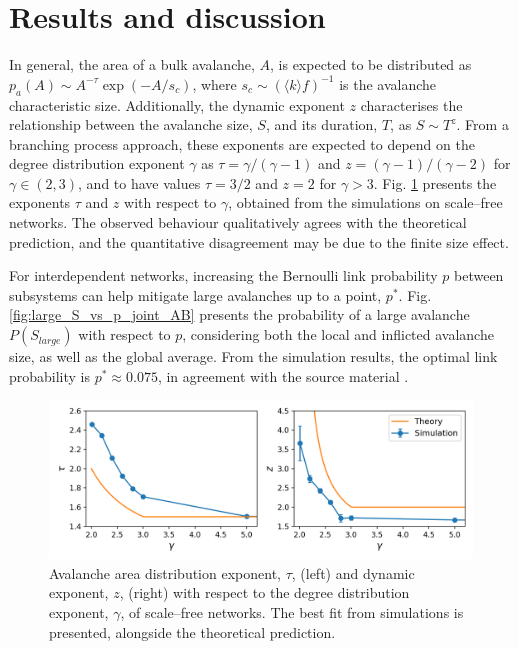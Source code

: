 \section{Results and discussion}

In general, the area of a bulk avalanche, $A$, is expected to be distributed as $p_a(A)\sim A^{-\tau}\exp(-A/s_c)$, where $s_c\sim (\langle k\rangle f)^{-1}$ is the avalanche characteristic size. Additionally, the dynamic exponent $z$ characterises the relationship between the avalanche size, $S$, and its duration, $T$, as $S\sim T^z$. From a branching process approach, these exponents are expected to depend on the degree distribution exponent $\gamma$ as $\tau=\gamma/(\gamma-1)$ and $z=(\gamma-1)/(\gamma-2)$ for $\gamma\in(2,3)$, and to have values $\tau=3/2$ and $z=2$ for $\gamma>3$. Fig. \ref{fig:tau_and_z_vs_gamma} presents the exponents $\tau$ and $z$ with respect to $\gamma$, obtained from the simulations on scale--free networks. The observed behaviour qualitatively agrees with the theoretical prediction, and the quantitative disagreement may be due to the finite size effect. 

For interdependent networks, increasing the Bernoulli link probability $p$ between subsystems can help mitigate large avalanches up to a point, $p^*$. Fig. \ref{fig:large_S_vs_p_joint_AB} presents the probability of a large avalanche $P(S_{large})$ with respect to $p$, considering both the local and inflicted avalanche size, as well as the global average. From the simulation results, the optimal link probability is $p^*\approx 0.075$, in agreement with the source material \cite{brummitt2012suppressing}.

\begin{figure}[!h]
	\begin{center}
	\includegraphics[scale=0.75]{./images/task_15/tau_and_z_vs_gamma.png} 
	\end{center}
	\caption{Avalanche area distribution exponent, $\tau$, (left) and dynamic exponent, $z$, (right) with respect to the degree distribution exponent, $\gamma$, of scale--free networks. The best fit from simulations is presented, alongside the theoretical prediction. \\} 
	\label{fig:tau_and_z_vs_gamma} 
\end{figure}

